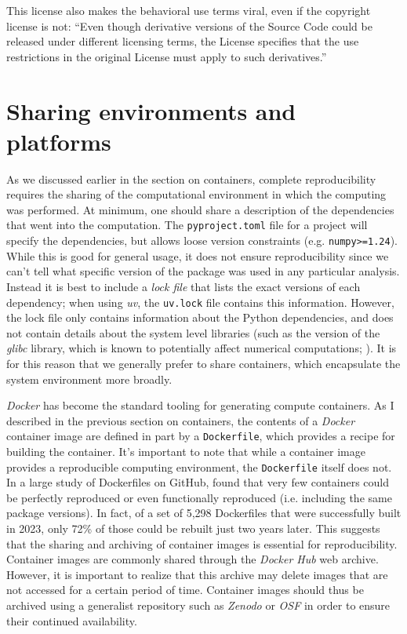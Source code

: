 This license also makes the behavioral use terms viral, even if the copyright license is not: ``Even though derivative versions of the Source Code could be released under different licensing terms, the License specifies that the use restrictions in the original License must apply to such derivatives.''

\section{Sharing environments and platforms}

As we discussed earlier in the section on containers, complete reproducibility requires the sharing of the computational environment in which the computing was performed.  At minimum, one should share a description of the dependencies that went into the computation.  The \texttt{pyproject.toml} file for a project will specify the dependencies, but allows loose version constraints (e.g. \texttt{numpy\textgreater =1.24}).  While this is good for general usage, it does not ensure reproducibility since we can't tell what specific version of the package was used in any particular analysis.  Instead it is best to include a \textit{lock file} that lists the exact versions of each dependency; when using \textit{uv}, the \texttt{uv.lock} file contains this information.  However, the lock file only contains information about the Python dependencies, and does not contain details about the system level libraries (such as the version of the \textit{glibc} library, which is known to potentially affect numerical computations; \citep{Glatard:2015aa}). It is for this reason that we generally prefer to share containers, which encapsulate the system environment more broadly.

\textit{Docker} has become the standard tooling for generating compute containers.  As I described in the previous section on containers, the contents of a \textit{Docker} container image are defined in part by a \texttt{Dockerfile}, which provides a recipe for building the container.  It's important to note that while a container image provides a reproducible computing environment, the \texttt{Dockerfile} itself does not.  In a large study of Dockerfiles on GitHub, \citep{Malka:2026aa} found that very few containers could be perfectly reproduced or even functionally reproduced (i.e. including the same package versions). In fact, of a set of 5,298 Dockerfiles that were successfully built in 2023, only 72\% of those could be rebuilt just two years later.  This suggests that the sharing and archiving of container images is essential for reproducibility.  Container images are commonly shared through the \textit{Docker Hub} web archive. However, it is important to realize that this archive may delete images that are not accessed for a certain period of time.  Container images should thus be archived using a generalist repository such as \textit{Zenodo} or \textit{OSF} in order to ensure their continued availability.